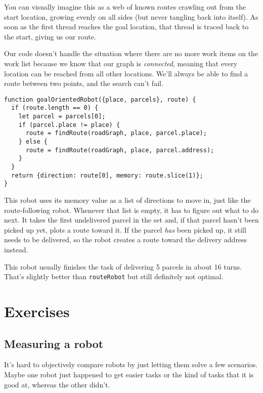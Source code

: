 You can visually imagine this as a web of known routes crawling out from the start location, growing evenly on all sides (but never tangling back into itself). As soon as the first thread reaches the goal location, that thread is traced back to the start, giving us our route.

Our code doesn't handle the situation where there are no more work items on the work list because we know that our graph is \emph{connected}, meaning that every location can be reached from all other locations. We'll always be able to find a route between two points, and the search can't fail.

\begin{lstlisting}
function goalOrientedRobot({place, parcels}, route) {
  if (route.length == 0) {
    let parcel = parcels[0];
    if (parcel.place != place) {
      route = findRoute(roadGraph, place, parcel.place);
    } else {
      route = findRoute(roadGraph, place, parcel.address);
    }
  }
  return {direction: route[0], memory: route.slice(1)};
}
\end{lstlisting}
\noindent{}

This robot uses its memory value as a list of directions to move in, just like the route-following robot. Whenever that list is empty, it has to figure out what to do next. It takes the first undelivered parcel in the set and, if that parcel hasn't been picked up yet, plots a route toward it. If the parcel \emph{has} been picked up, it still needs to be delivered, so the robot creates a route toward the delivery address instead.

This robot usually finishes the task of delivering 5 parcels in about 16 turns. That's slightly better than \lstinline`routeRobot` but still definitely not optimal.

\section{Exercises}

\subsection{Measuring a robot}

It's hard to objectively compare robots by just letting them solve a few scenarios. Maybe one robot just happened to get easier tasks or the kind of tasks that it is good at, whereas the other didn't.

